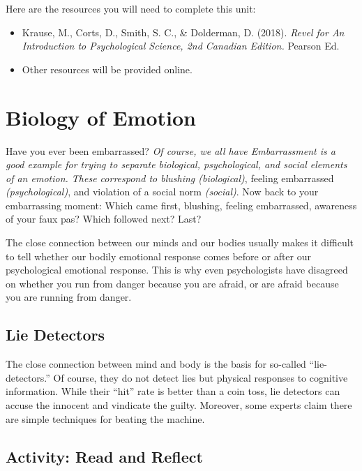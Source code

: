 \documentclass[
]{book}
\providecommand{\tightlist}{%
  \setlength{\itemsep}{0pt}\setlength{\parskip}{0pt}}
\begin{document}
Here are the resources you will need to complete this unit:

\begin{itemize}
\tightlist
\item
  Krause, M., Corts, D., Smith, S. C., \& Dolderman, D. (2018). \emph{Revel for An Introduction to Psychological Science, 2nd Canadian Edition.} Pearson Ed.\\
\item
  Other resources will be provided online.
\end{itemize}

\hypertarget{biology-of-emotion}{%
\section{Biology of Emotion}\label{biology-of-emotion}}

Have you ever been embarrassed? \emph{Of course, we all have Embarrassment is a good example for trying to sepa­rate biological, psychological, and social elements of an emotion. These correspond to blushing (biological)}, feeling embarrassed \emph{(psychological)}, and violation of a social norm \emph{(social)}. Now back to your embarrassing moment: Which came first, blushing, feeling embarrassed, awareness of your faux pas? Which followed next? Last?

The close connection between our minds and our bodies usually makes it difficult to tell whether our bodily emotional response comes before or after our psychological emotional response. This is why even psychologists have disagreed on whether you run from danger because you are afraid, or are afraid because you are running from danger.

\hypertarget{lie-detectors}{%
\subsection*{Lie Detectors}\label{lie-detectors}}

The close connection between mind and body is the basis for so-called ``lie-detectors.'' Of course, they do not detect lies but physical responses to cognitive information. While their ``hit'' rate is better than a coin toss, lie detectors can accuse the in­nocent and vindicate the guilty. Moreover, some experts claim there are simple techniques for beating the ma­chine.

\hypertarget{activity-read-and-reflect-11}{%
\subsection*{Activity: Read and Reflect}\label{activity-read-and-reflect-11}}
\end{document}
